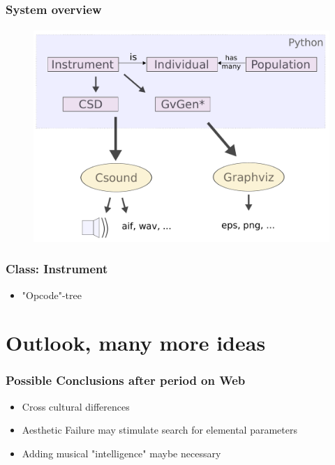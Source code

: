 \documentclass{beamer}
\begin{document}
\begin{frame}
	\frametitle{System overview}
	\framesubtitle{}
        \begin{figure}[h]
          \centering
          \includegraphics[scale=0.3]{images/overview.pdf}
	\end{figure}
\end{frame}


\begin{frame}
	\frametitle{Class: Instrument}
	\begin{itemize}
	\item<1-> "Opcode"-tree
        \end{itemize}
\end{frame}


\label{sg:sec:imple}




\section{Outlook, many more ideas} %
\label{sg:sec:outlook_many_more_ideas}
\begin{frame}
	\frametitle{Possible Conclusions after period on Web}
	\begin{itemize}
	\item<1-> Cross cultural differences 
	\item<2-> Aesthetic Failure may stimulate search for elemental parameters
	\item<3-> Adding musical "intelligence" maybe necessary
	 \end{itemize}

\end{frame}
	
\end{document}
